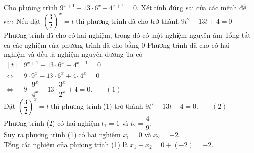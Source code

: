 \begin{ex}%
	Cho phương trình $9^{x+1}-13\cdot 6^x+4^{x+1}=0$. Xét tính đúng sai của các mệnh đề sau
	\choiceTF
	{\True Nếu đặt $\left(\dfrac{3}{2}\right)^x=t$ thì phương trình đã cho trở thành $9t^2-13t+4=0$}
	{\True Phương trình đã cho có hai nghiệm, trong đó có một nghiệm nguyên âm}
	{Tổng tất cả các nghiệm của phương trình đã cho bằng 0}
	{Phương trình đã cho có hai nghiệm và đều là nghiệm nguyên dương}
	\loigiai
	{
		Ta có
		$\begin{aligned}[t]
			&9^{x+1}-13\cdot 6^x+4^{x+1}=0\\
			\Leftrightarrow~&9\cdot 9^x-13\cdot 6^x+4\cdot 4^x=0\\
			\Leftrightarrow~&9\cdot \dfrac{9^x}{4^x}-13\cdot \dfrac{3^x}{2^x}+4=0.\qquad(1)
		\end{aligned}$\\
		Đặt $\left(\dfrac{3}{2}\right)^x=t$  thì phương trình (1) trở thành $9t^2-13t+4=0.\qquad (2)$\\
		Phương trình (2) có hai nghiệm $t_1=1$ và $t_2=\dfrac{4}{9}$.\\
		Suy ra phương trình (1) có hai nghiệm $x_1=0$ và $x_2=-2$.\\
		Tổng các nghiệm của phương trình (1) là $x_1+x_2=0+(-2)=-2$.\\
		
	}
\end{ex}

